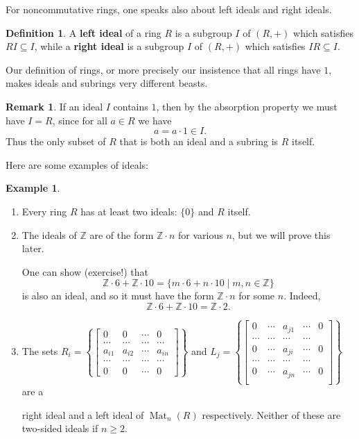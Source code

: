 \documentclass[12pt]{report}
\numberwithin{equation}{section}
\numberwithin{theorem}{chapter}
\theoremstyle{definition}
\newtheorem{definition}[theorem]{Definition}
\newtheorem{example}[theorem]{Example}
\newtheorem*{basic properties}{Basic Properties}
\newtheorem*{Important Remark}{Important Remark}
\newtheorem{remark}[theorem]{Remark}
\newcommand{\df}[1]{{\bf #1}\index{#1}}
\newcommand{\Z}{\mathbb{Z}}
\DeclareMathOperator{\Mat}{Mat}
\begin{document}
For noncommutative rings, one speaks also about left ideals and right ideals. 

\begin{definition}
A \df{left ideal} of a ring $R$ is a subgroup $I$ of $(R,+)$ which satisfies $RI \subseteq I$, while a \df{right ideal} is a subgroup $I$ of $(R,+)$ which satisfies $IR \subseteq I$. 
\end{definition}

Our definition of rings, or more precisely our insistence that all rings have $1$, makes ideals and subrings very different beasts.

\begin{remark} 
If an ideal $I$ contains $1$, then by the absorption property we must have $I = R$, since for all $a \in R$ we have
$$a = a \cdot 1 \in I.$$
Thus the only subset of $R$ that is both an ideal and a subring is $R$ itself.
\end{remark}


Here are some examples of ideals:

\begin{example}
\begin{enumerate}
\item Every ring $R$ has at least two ideals: $\{0\}$ and $R$ itself. 

\item The ideals of $\Z$ are of the form $\Z \cdot n$ for various $n$, but we will prove this later. %

One can show (exercise!) that 
$$\Z \cdot 6 + \Z \cdot 10 = \{m \cdot 6 + n \cdot 10 \mid m,n \in \Z\}$$ 
is also an ideal, and so it must have the form $\Z \cdot n$ for some $n$. Indeed, 
$$\Z \cdot 6 + \Z \cdot 10 = \Z \cdot 2.$$

\item The sets $R_i=\left\{\begin{bmatrix} 0 & 0 & \cdots & 0\\ \cdots & \cdots & \cdots & \cdots \\ a_{i1} & a_{i2} & \cdots &a_{in} \\  \cdots & \cdots & \cdots & \cdots \\  0 &
      0 & \cdots &0\end{bmatrix}\right\}$ and $L_j=\left\{\begin{bmatrix} 0 & \cdots & a_{j1} &\cdots & 0\\ \cdots & \cdots & \cdots & \cdots \\0 & \cdots & a_{ji} &\cdots & 0\\
      \cdots & \cdots & \cdots & \cdots \\ 0 & \cdots & a_{jn} &\cdots & 0\\\end{bmatrix}\right\}$ are a 

\noindent      
right ideal and a left ideal of $\Mat_n(R)$ respectively. Neither of these are two-sided ideals if $n \geqslant 2$.	
\end{enumerate}
\end{example}
\end{document}
